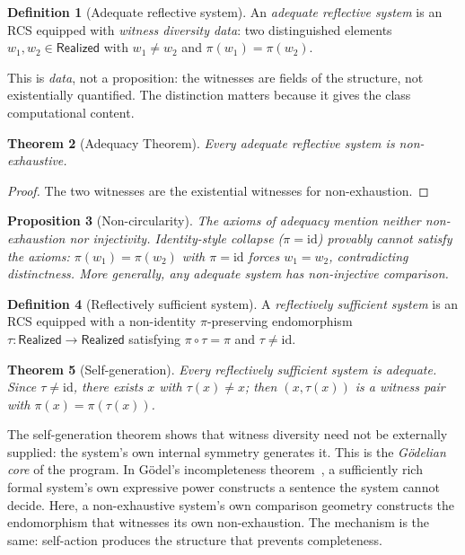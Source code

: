 \documentclass[11pt,a4paper]{article}
\theoremstyle{plain}
\newtheorem{theorem}{Theorem}[section]
\newtheorem{proposition}[theorem]{Proposition}
\theoremstyle{definition}
\newtheorem{definition}[theorem]{Definition}
\theoremstyle{remark}
\newcommand{\Real}{\mathsf{Realized}}
\newcommand{\compare}{\pi}
\begin{document}
\begin{definition}[Adequate reflective system]\label{def:adequate}
An \emph{adequate reflective system} is an RCS equipped with
\emph{witness diversity data}: two distinguished elements
$w_1, w_2 \in \Real$ with $w_1 \neq w_2$ and
$\compare(w_1) = \compare(w_2)$.
\end{definition}

This is \emph{data}, not a proposition: the witnesses are fields of the
structure, not existentially quantified. The distinction matters because it
gives the class computational content.

\begin{theorem}[Adequacy Theorem]\label{thm:adequate-ne}
Every adequate reflective system is non-exhaustive.
\end{theorem}

\begin{proof}
The two witnesses are the existential witnesses for non-exhaustion.
\end{proof}

\begin{proposition}[Non-circularity]\label{prop:non-circ}
The axioms of adequacy mention neither non-exhaustion nor injectivity.
Identity-style collapse ($\compare = \mathrm{id}$) provably cannot satisfy
the axioms: $\compare(w_1) = \compare(w_2)$ with $\compare = \mathrm{id}$
forces $w_1 = w_2$, contradicting distinctness. More generally, any adequate
system has non-injective comparison.
\end{proposition}

\begin{definition}[Reflectively sufficient system]\label{def:refl-suff}
A \emph{reflectively sufficient system} is an RCS equipped with a
non-identity $\compare$-preserving endomorphism
$\tau : \Real \to \Real$ satisfying $\compare \circ \tau = \compare$
and $\tau \neq \mathrm{id}$.
\end{definition}

\begin{theorem}[Self-generation]\label{thm:self-gen}
Every reflectively sufficient system is adequate. Since $\tau \neq \mathrm{id}$,
there exists $x$ with $\tau(x) \neq x$; then $(x, \tau(x))$ is a witness pair
with $\compare(x) = \compare(\tau(x))$.
\end{theorem}

The self-generation theorem shows that witness diversity need not be externally
supplied: the system's own internal symmetry generates it. This is the
\emph{Gödelian core} of the program. In Gödel's incompleteness theorem~\cite{Godel1931}, a
sufficiently rich formal system's own expressive power constructs a sentence
the system cannot decide. Here, a non-exhaustive system's own comparison
geometry constructs the endomorphism that witnesses its own non-exhaustion.
The mechanism is the same: self-action produces the structure that prevents
completeness.
\end{document}

